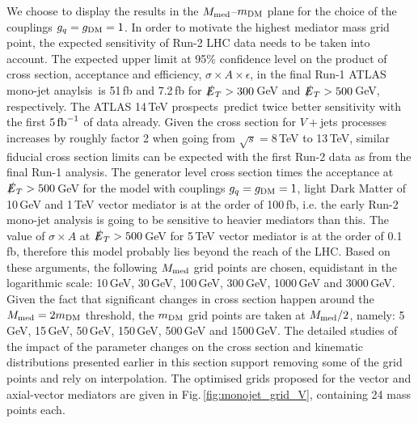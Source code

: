 We choose to display the results in the $M_{\rm{med}}$--$m_{\rm{DM}}$ plane for the choice of the couplings $g_q=g_{\rm{DM}}=1$. In order to motivate the highest mediator mass grid point, the expected sensitivity of Run-2 LHC data needs to be taken into account.
The expected upper limit at 95\% confidence level on the product of cross section, acceptance and efficiency, $\sigma\times A\times\epsilon$, in the final Run-1 ATLAS mono-jet anaylsis\,\cite{Aad:2015zva} is 51\,fb and 7.2\,fb  for $\slashed{E}_T>300$\,GeV and $\slashed{E}_T>500$\,GeV, respectively. The ATLAS 14\,TeV prospects\,\cite{ATL-PHYS-PUB-2014-007} predict twice better sensitivity with the first $5\,\rm{fb}^{-1}$ of data already. Given the cross section for $V+$jets processes increases by roughly factor 2 %
when going from $\sqrt{s}=8$\,TeV to 13\,TeV, similar fiducial cross section limits can be expected with the first Run-2 data as from the final Run-1 analysis.
The generator level cross section times the acceptance at $\slashed{E}_T>500$\,GeV for the model with couplings $g_q=g_{\rm{DM}}=1$, light Dark Matter of 10\,GeV and 1\,TeV vector mediator is at the order of 100\,fb, i.e. the early Run-2 mono-jet analysis is going to be sensitive to heavier mediators than this. The value of $\sigma\times A$ at $\slashed{E}_T>500$\,GeV for 5\,TeV vector mediator is at the order of 0.1\,fb, therefore this model probably lies beyond the reach of the LHC.
Based on these arguments, the following $M_{\rm{med}}$ grid points are chosen, equidistant in the logarithmic scale: 10\,GeV, 30\,GeV, 100\,GeV, 300\,GeV, 1000\,GeV and 3000\,GeV. Given the fact that significant changes in cross section happen around the $M_{\rm{med}}=2m_{\rm{DM}}$ threshold, the $m_{\rm{DM}}$ grid points are taken at $M_{\rm{med}}/2$, namely: 5\,GeV, 15\,GeV, 50\,GeV, 150\,GeV, 500\,GeV and 1500\,GeV.
The detailed studies of the impact of the parameter changes on the cross section and kinematic distributions presented earlier in this section support removing some of the grid points and rely on interpolation. The optimised grids proposed for the vector and axial-vector mediators are given in Fig.\,\ref{fig:monojet_grid_V}, containing 24 mass points each.

